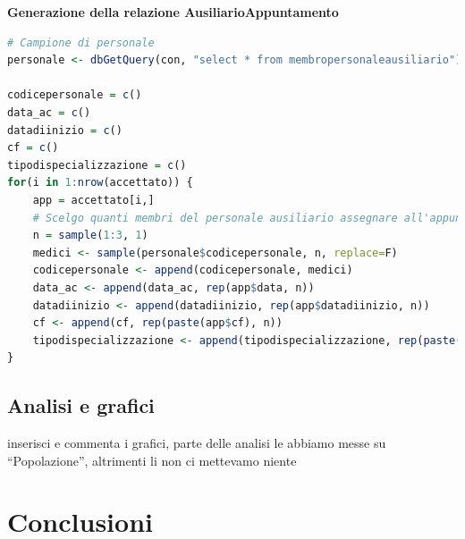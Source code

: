 \documentclass[11pt]{article}
\begin{document}
\textbf{Generazione della relazione AusiliarioAppuntamento}
\begin{lstlisting}[language=R]
# Campione di personale
personale <- dbGetQuery(con, "select * from membropersonaleausiliario")

codicepersonale = c()
data_ac = c()
datadiinizio = c()
cf = c()
tipodispecializzazione = c()
for(i in 1:nrow(accettato)) {
    app = accettato[i,]
    # Scelgo quanti membri del personale ausiliario assegnare all'appuntamento
    n = sample(1:3, 1)
    medici <- sample(personale$codicepersonale, n, replace=F)
    codicepersonale <- append(codicepersonale, medici)
    data_ac <- append(data_ac, rep(app$data, n))
    datadiinizio <- append(datadiinizio, rep(app$datadiinizio, n))
    cf <- append(cf, rep(paste(app$cf), n))
    tipodispecializzazione <- append(tipodispecializzazione, rep(paste(app$tipodispecializzazione), n))
}
\end{lstlisting}

\subsection{Analisi e grafici}
inserisci e commenta i grafici, parte delle analisi le abbiamo messe su ``Popolazione'', altrimenti li non ci mettevamo niente

\section{Conclusioni}
\end{document}
